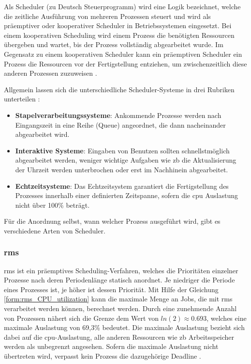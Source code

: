 \documentclass[../EDF Master Thesis.tex]{subfiles}
\begin{document}
Als Scheduler (zu Deutsch Steuerprogramm) wird eine Logik bezeichnet, welche die zeitliche Ausführung von mehreren Prozessen steuert und wird als präemptiver oder kooperativer Scheduler in Betriebssystemen eingesetzt.
Bei einem kooperativen Scheduling wird einem Prozess die benötigten Ressourcen übergeben und wartet, bis der Prozess vollständig abgearbeitet wurde.
Im Gegensatz zu einem kooperativen Scheduler kann ein präemptiven Scheduler ein Prozess die Ressourcen vor der Fertigstellung entziehen, um zwischenzeitlich diese anderen Prozessen zuzuweisen \parencite{wiki:003}.

Allgemein lassen sich die unterschiedliche Scheduler-Systeme in drei Rubriken unterteilen \parencite{wiki:007}:
\begin{itemize}
    \item \textbf{Stapelverarbeitungssysteme}: Ankommende Prozesse werden nach Eingangszeit in eine Reihe (Queue) angeordnet, die dann nacheinander abgearbeitet wird.
    \item \textbf{Interaktive Systeme}: Eingaben von Benutzen sollten schnellstmöglich abgearbeitet werden, weniger wichtige Aufgaben wie \ac{zb} die Aktualisierung der Uhrzeit werden unterbrochen oder erst im Nachhinein abgearbeitet.
    \item \textbf{Echtzeitsysteme}: Das Echtzeitsystem garantiert die Fertigstellung des Prozesses innerhalb einer definierten Zeitspanne, sofern die \ac{cpu} Auslastung nicht über 100\% beträgt.
\end{itemize}
Für die Anordnung selbst, wann welcher Prozess ausgeführt wird, gibt es verschiedene Arten von Scheduler.


\subsubsection{\ac{rms}} \label{section:rms}
    \ac{rms} ist ein präemptives Scheduling-Verfahren, welches die Prioritäten einzelner Prozesse nach deren Periodenlänge statisch anordnet.
    Je niedriger die Periode eines Prozesses ist, je höher ist dessen Priorität.
    Mit Hilfe der Gleichung \ref{form:rms_CPU_utilization} kann die maximale Menge an Jobs, die mit \ac{rms} verarbeitet werden können, berechnet werden.
    Durch eine zunehmende Anzahl von Prozessen nähert sich die Grenze dem Wert von $ln(2) \approx 0.693$, welches eine maximale Auslastung von 69,3\% bedeutet.
    Die maximale Auslastung bezieht sich dabei auf die \ac{cpu}-Auslastung, alle anderen Ressourcen wie \ac{zb} Arbeitsspeicher werden als unbegrenzt angesehen.
    Sofern die maximale Auslastung nicht übertreten wird, verpasst kein Prozess die dazugehörige Deadline \parencite{wiki:004}.
\end{document}
